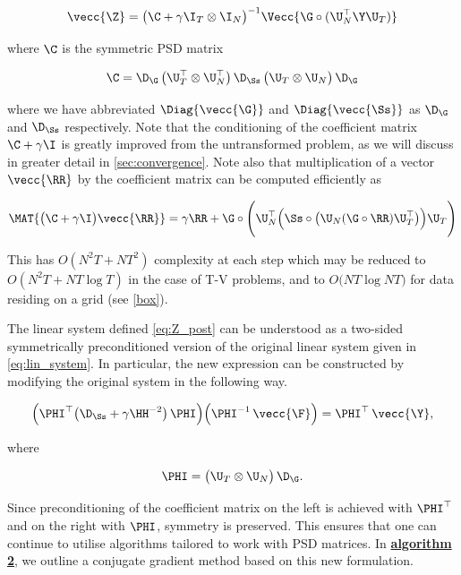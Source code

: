 \begin{equation}
    \label{eq:Z_post}
    \vecc{\Z} = \big( \C + \gamma \I_T \otimes \I_N \big) ^{-1} \Vecc{\G \circ (\U_N^\top \Y \U_T)}
\end{equation}

\noindent where $\C$ is the symmetric PSD matrix


\begin{equation}
    \label{eq:Q}
    \C = \D_{\G} \, \big(\U_T^\top \otimes \U_N^\top \big)\, \D_{\Ss} \, \big(\U_T \otimes \U_N \big) \,\D_{\G}
\end{equation}

\noindent where we have abbreviated $\Diag{\vecc{\G}}$ and $\Diag{\vecc{\Ss}}$ as $\D_{\G}$ and $\D_{\Ss}$ respectively. Note that the conditioning of the coefficient matrix $\C + \gamma \I$ is greatly improved from the untransformed problem, as we will discuss in greater detail in \cref{sec:convergence}. Note also that multiplication of a vector $\vecc{\RR}$ by the coefficient matrix can be computed efficiently as 

$$
\MAT{\big(\C + \gamma \I \big)\vecc{\RR}} = \gamma \RR + \G \circ \Bigg(\U_N^\top \Big( \Ss \circ \big(\U_N (\G \circ \RR) \U_T^\top \big) \Big) \U_T\Bigg) 
$$

This has $O(N^2T + NT^2)$ complexity at each step which may be  reduced to $O(N^2T + NT \log T)$ in the case of T-V problems, and to $O\big(NT \log NT \big)$ for data residing on a grid (see \cref{box}). 

The linear system defined \cref{eq:Z_post} can be understood as a two-sided symmetrically preconditioned version of the original linear system given in \cref{eq:lin_system}. In particular, the new expression can be constructed by modifying the original system in the following way.

\begin{equation}
    \Big(\PHI^\top  \big(\D_{\Ss} + \gamma  \HH^{-2}\big) \, \PHI  \Big) \Big(\PHI^{-1}\, \vecc{ \F } \Big) = \PHI^\top \, \vecc{\Y},
\end{equation}

\noindent where

\begin{equation}
    \PHI =   \big(\U_T \otimes \U_N\big) \, \D_{\G}.
\end{equation}

Since preconditioning of the coefficient matrix on the left is achieved with $\PHI^\top$ and on the right with $\PHI$, symmetry is preserved. This ensures that one can continue to utilise algorithms tailored to work with PSD matrices. In \hyperlink{al2}{\textbf{algorithm 2}}, we outline a conjugate gradient method based on this new formulation. 

